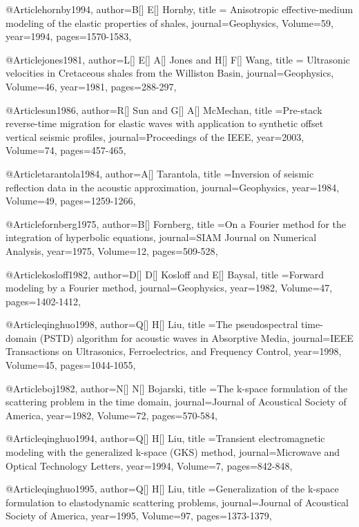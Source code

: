 {@Article{hornby1994,
  author={B[] E[] Hornby},
  title = {Anisotropic effective-medium modeling of the elastic properties of shales},
  journal={Geophysics},
  Volume=59,
  year=1994,
  pages={1570-1583},
}

@Article{jones1981,
  author={L[] E[] A[] Jones and H[] F[] Wang},
  title = {Ultrasonic velocities in Cretaceous shales from the Williston Basin},
  journal={Geophysics},
  Volume=46,
  year=1981,
  pages={288-297},
}


@Article{sun1986,
  author={R[] Sun and G[] A[] McMechan},
  title ={Pre-stack reverse-time migration for elastic waves with application to synthetic offset vertical seismic profiles},
  journal={Proceedings of the IEEE},
  year=2003,
  Volume=74,
  pages={457-465},
}

@Article{tarantola1984,
  author={A[] Tarantola},
  title ={Inversion of seismic reflection data in the acoustic approximation},
  journal={Geophysics},
  year=1984,
  Volume=49,
  pages={1259-1266},
}

@Article{fornberg1975,
  author={B[] Fornberg},
  title ={On a Fourier method for the integration of hyperbolic equations},
  journal={SIAM Journal on Numerical Analysis},
  year=1975,
  Volume=12,
  pages={509-528},
}

@Article{kosloff1982,
  author={D[] D[] Kosloff and E[] Baysal},
  title ={Forward modeling by a Fourier method},
  journal={Geophysics},
  year=1982,
  Volume=47,
  pages={1402-1412},
}

@Article{qinghuo1998,
  author={Q[] H[] Liu},
  title ={The pseudospectral time-domain (PSTD) algorithm for acoustic waves in Absorptive Media},
  journal={IEEE Transactions on Ultrasonics, Ferroelectrics, and Frequency Control},
  year=1998,
  Volume=45,
  pages={1044-1055},
}

@Article{boj1982,
  author={N[] N[] Bojarski},
  title ={The k-space formulation of the scattering problem in the time domain},
  journal={Journal of Acoustical Society of America},
  year=1982,
  Volume=72,
  pages={570-584},
}


@Article{qinghuo1994,
  author={Q[] H[] Liu},
  title ={Transient electromagnetic modeling with the generalized k-space (GKS) method},
  journal={Microwave and Optical Technology Letters},
  year=1994,
  Volume=7,
  pages={842-848},
}

@Article{qinghuo1995,
  author={Q[] H[] Liu},
  title ={Generalization of the k-space formulation to elastodynamic scattering problems},
  journal={Journal of Acoustical Society of America},
  year=1995,
  Volume=97,
  pages={1373-1379},
}

}
